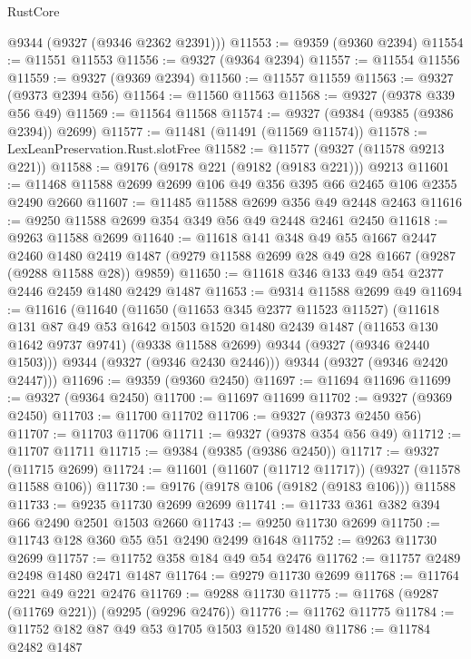 \begin{lexlean}{RustCore}
\begin{coremodule}
      @9344
      (@9327 (@9346 @2362 @2391)))
@11553 := @9359 (@9360 @2394)
@11554 := @11551 @11553
@11556 := @9327 (@9364 @2394)
@11557 := @11554 @11556
@11559 := @9327 (@9369 @2394)
@11560 := @11557 @11559
@11563 := @9327 (@9373 @2394 @56)
@11564 := @11560 @11563
@11568 := @9327 (@9378 @339 @56 @49)
@11569 := @11564 @11568
@11574 := @9327 (@9384 (@9385 (@9386 @2394)) @2699)
@11577 := @11481 (@11491 (@11569 @11574))
@11578 := LexLeanPreservation.Rust.slotFree
@11582 := @11577 (@9327 (@11578 @9213 @221))
@11588 := @9176 (@9178 @221 (@9182 (@9183 @221))) @9213
@11601 := @11468 @11588 @2699 @2699 @106 @49 @356 @395 @66 @2465 @106 @2355 @2490 @2660
@11607 := @11485 @11588 @2699 @356 @49 @2448 @2463
@11616 := @9250 @11588 @2699 @354 @349 @56 @49 @2448 @2461 @2450
@11618 := @9263 @11588 @2699
@11640 := @11618
    @141
    @348
    @49
    @55
    @1667
    @2447
    @2460
    @1480
    @2419
    @1487
    (@9279 @11588 @2699 @28 @49 @28 @1667 (@9287 (@9288 @11588 @28)) @9859)
@11650 := @11618 @346 @133 @49 @54 @2377 @2446 @2459 @1480 @2429 @1487
@11653 := @9314 @11588 @2699 @49
@11694 := @11616
    (@11640
      (@11650
        (@11653 @345 @2377 @11523 @11527)
        (@11618
          @131
          @87
          @49
          @53
          @1642
          @1503
          @1520
          @1480
          @2439
          @1487
          (@11653 @130 @1642 @9737 @9741)
          (@9338 @11588 @2699)
          @9344
          (@9327 (@9346 @2440 @1503)))
        @9344
        (@9327 (@9346 @2430 @2446)))
      @9344
      (@9327 (@9346 @2420 @2447)))
@11696 := @9359 (@9360 @2450)
@11697 := @11694 @11696
@11699 := @9327 (@9364 @2450)
@11700 := @11697 @11699
@11702 := @9327 (@9369 @2450)
@11703 := @11700 @11702
@11706 := @9327 (@9373 @2450 @56)
@11707 := @11703 @11706
@11711 := @9327 (@9378 @354 @56 @49)
@11712 := @11707 @11711
@11715 := @9384 (@9385 (@9386 @2450))
@11717 := @9327 (@11715 @2699)
@11724 := @11601 (@11607 (@11712 @11717)) (@9327 (@11578 @11588 @106))
@11730 := @9176 (@9178 @106 (@9182 (@9183 @106))) @11588
@11733 := @9235 @11730 @2699 @2699
@11741 := @11733 @361 @382 @394 @66 @2490 @2501 @1503 @2660
@11743 := @9250 @11730 @2699
@11750 := @11743 @128 @360 @55 @51 @2490 @2499 @1648
@11752 := @9263 @11730 @2699
@11757 := @11752 @358 @184 @49 @54 @2476
@11762 := @11757 @2489 @2498 @1480 @2471 @1487
@11764 := @9279 @11730 @2699
@11768 := @11764 @221 @49 @221 @2476
@11769 := @9288 @11730
@11775 := @11768 (@9287 (@11769 @221)) (@9295 (@9296 @2476))
@11776 := @11762 @11775
@11784 := @11752 @182 @87 @49 @53 @1705 @1503 @1520 @1480
@11786 := @11784 @2482 @1487

\end{coremodule}
\end{lexlean}
